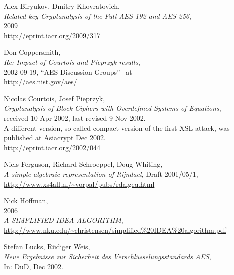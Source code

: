 \newpage
\begin{thebibliography}{99999}

 
	Alex Biryukov, Dmitry Khovratovich, \\
	{\em Related-key Cryptanalysis of the Full AES-192 and AES-256}, \\
	2009 \\
	\url{http://eprint.iacr.org/2009/317}

  
        Don Coppersmith, \\
        {\em Re: Impact of Courtois and Pieprzyk results}, \\
        2002-09-19, ``AES Discussion Groups''~ at \\
        \url{http://aes.nist.gov/aes/}

  
        Nicolas Courtois, Josef Pieprzyk, \\
        {\em Cryptanalysis of Block Ciphers with Overdefined Systems
             of Equations}, \\
        received 10 Apr 2002, last revised 9 Nov 2002.\\
        A different version, so called compact version of the first XSL attack,
        was published at Asiacrypt Dec 2002. \\
        \url{http://eprint.iacr.org/2002/044}

  
       Niels Ferguson, Richard Schroeppel, Doug Whiting, \\
       {\em A simple algebraic representation of Rijndael}, 
       Draft 2001/05/1, \\
       \url{http://www.xs4all.nl/~vorpal/pubs/rdalgeq.html}

  
       Nick Hoffman, \\
	2006 \\
       {\em A SIMPLIFIED IDEA ALGORITHM},\\
       \url{http://www.nku.edu/~christensen/simplified%20IDEA%20algorithm.pdf}

  
       Stefan Lucks, R\"udiger Weis, \\
       {\em Neue Ergebnisse zur Sicherheit des Verschl\"usselungsstandards AES},\\
       In: DuD, Dec 2002.


\end{thebibliography}
